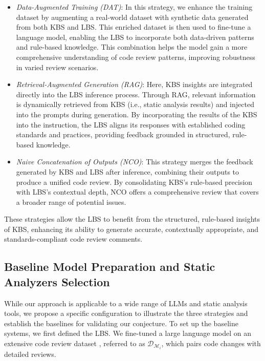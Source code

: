 \begin{itemize} 
    \item \emph{Data-Augmented Training (DAT)}: In this strategy, we enhance the training dataset by augmenting a real-world dataset with synthetic data generated from both KBS and LBS. This enriched dataset is then used to fine-tune a language model, enabling the LBS to incorporate both data-driven patterns and rule-based knowledge. This combination helps the model gain a more comprehensive understanding of code review patterns, improving robustness in varied review scenarios.
    \item \emph{Retrieval-Augmented Generation (RAG)}: Here, KBS insights are integrated directly into the LBS inference process. Through RAG, relevant information is dynamically retrieved from KBS (i.e., static analysis results) and injected into the prompts during generation. By incorporating the results of the KBS into the instruction, the LBS aligns its responses with established coding standards and practices, providing feedback grounded in structured, rule-based knowledge.
    \item \emph{Naive Concatenation of Outputs (NCO)}: This strategy merges the feedback generated by KBS and LBS after inference, combining their outputs to produce a unified code review. By consolidating KBS’s rule-based precision with LBS’s contextual depth, NCO offers a comprehensive review that covers a broader range of potential issues.
\end{itemize}

These strategies allow the LBS to benefit from the structured, rule-based insights of KBS, enhancing its ability to generate accurate, contextually appropriate, and standards-compliant code review comments.


\subsection{Baseline Model Preparation and Static Analyzers Selection}

While our approach is applicable to a wide range of LLMs and static analysis tools, we propose a specific configuration to illustrate the three strategies and establish the baselines for validating our conjecture. To set up the baseline systems, we first defined the LBS. We fine-tuned a large language model on an extensive code review dataset \cite{li2022automating}, referred to as \(\mathcal{D}_{\mathcal{M}_i}\), which pairs code changes with detailed reviews.

